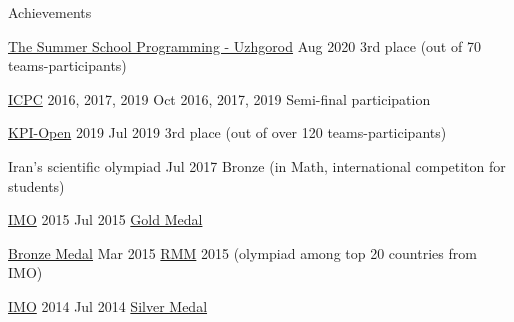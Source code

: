 \begin{honors}{Achievements}

  \honor
  {\href{http://codeschool.uzhnu.edu.ua/en}{The Summer School Programming - Uzhgorod}}
  {Aug 2020}
  {3rd place (out of 70 teams-participants)}

  \honor
  {\href{https://icpc.global/}{ICPC} 2016, 2017, 2019}
  {Oct 2016, 2017, 2019}
  {Semi-final participation}

  \honor
  {\href{https://open.kpi.ua/en}{KPI-Open} 2019}
  {Jul 2019}
  {3rd place (out of over 120 teams-participants)}

  \honor
  {Iran's scientific olympiad}
  {Jul 2017}
  {Bronze (in Math, international competiton for students)}

  \honor
  {\href{https://www.imo-official.org/}{IMO} 2015}
  {Jul 2015}
  {\href{https://www.imo-official.org/participant_r.aspx?id=25121}{Gold Medal}}

  \honor
  {\href{http://rmms.lbi.ro/rmm2015/index.php?id=results_math}{Bronze Medal}}
  {Mar 2015}
  {
  \href{https://en.wikipedia.org/wiki/Romanian_Master_of_Mathematics_and_Sciences}{RMM} 2015
  (olympiad among top 20 countries from IMO)
  }

  \honor
  {\href{https://www.imo-official.org/}{IMO} 2014}
  {Jul 2014}
  {\href{https://www.imo-official.org/participant_r.aspx?id=25121}{Silver Medal}}

\end{honors}
